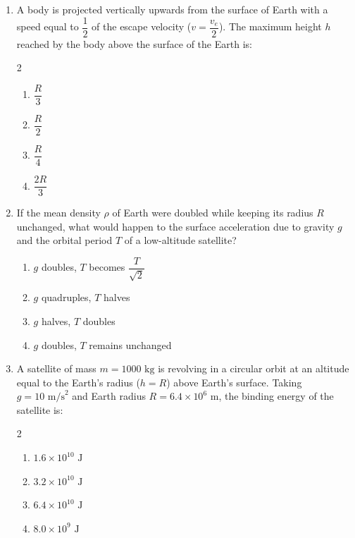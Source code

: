 \documentclass[11pt,a4paper]{article}
\begin{document}
\begin{enumerate}[label=\textbf{\arabic*.},leftmargin=18pt,itemsep=10pt]
  \item A body is projected vertically upwards from the surface of Earth with a speed equal to $\dfrac{1}{2}$ of the escape velocity ($v = \dfrac{v_e}{2}$). The maximum height $h$ reached by the body above the surface of the Earth is:
  \begin{multicols}{2}
    \begin{enumerate}[label=(\Alph*)]
      \item $\dfrac{R}{3}$
      \item $\dfrac{R}{2}$
      \item $\dfrac{R}{4}$
      \item $\dfrac{2R}{3}$
    \end{enumerate}
  \end{multicols}

  \item If the mean density $\rho$ of Earth were doubled while keeping its radius $R$ unchanged, what would happen to the surface acceleration due to gravity $g$ and the orbital period $T$ of a low-altitude satellite?
  \begin{enumerate}[label=(\Alph*)]
    \item $g$ doubles, $T$ becomes $\dfrac{T}{\sqrt{2}}$
    \item $g$ quadruples, $T$ halves
    \item $g$ halves, $T$ doubles
    \item $g$ doubles, $T$ remains unchanged
  \end{enumerate}

  \item A satellite of mass $m = 1000\text{ kg}$ is revolving in a circular orbit at an altitude equal to the Earth's radius ($h = R$) above Earth's surface. Taking $g = 10\text{ m/s}^2$ and Earth radius $R = 6.4 \times 10^6\text{ m}$, the binding energy of the satellite is:
  \begin{multicols}{2}
    \begin{enumerate}[label=(\Alph*)]
      \item $1.6 \times 10^{10}\text{ J}$
      \item $3.2 \times 10^{10}\text{ J}$
      \item $6.4 \times 10^{10}\text{ J}$
      \item $8.0 \times 10^{9}\text{ J}$
    \end{enumerate}
  \end{multicols}


\end{enumerate}
\end{document}
